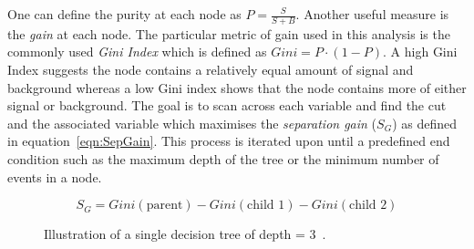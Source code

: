 One can define the purity at each node as $P=\frac{S}{S+B}$. Another useful measure is the \emph{gain} at each node. The particular metric of gain used in this analysis is the commonly used \emph{Gini Index} which is defined as $Gini = P\cdot\left(1-P\right)$. A high Gini Index suggests the node contains a relatively equal amount of signal and background whereas a low Gini index shows that the node contains more of either signal or background. 
The goal is to scan across each variable and find the cut and the associated variable which maximises the \emph{separation gain} ($S_{G}$) as defined in equation~\ref{eqn:SepGain}. This process is iterated upon until a predefined end condition such as the maximum depth of the tree or the minimum number of events in a node.




\begin{equation}
S_{G} = Gini(\textrm{parent}) - Gini(\textrm{child 1}) - Gini(\textrm{child 2})
\label{eqn:SepGain}
\end{equation}

\begin{figure}[h!]
\begin{center}
\hspace{0.2cm}
\end{center}
\caption{Illustration of a single decision tree of depth = 3~\cite{2007physics3039H}.}
\label{fig:alphaSuncorrected}
\end{figure} 

